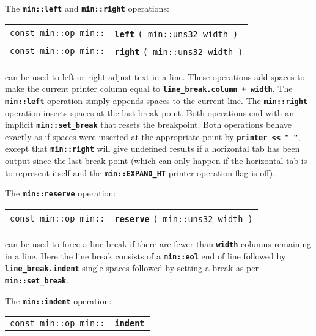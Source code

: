 \documentclass[12pt]{article}
\makeatletter
\newcommand{\TT}[1]{{\tt \bfseries #1}}
\newcommand{\ttindex}[1]{\index{#1@{\tt #1}}}
\newcommand{\EOL}{\penalty \exhyphenpenalty}
\newenvironment{indpar}[1][0.3in]%
	{\begin{list}{}%
		     {\setlength{\itemsep}{0in}%
		      \setlength{\topsep}{0in}%
		      \setlength{\parsep}{1ex}%
		      \setlength{\labelwidth}{#1}%
		      \setlength{\leftmargin}{#1}%
		      \addtolength{\leftmargin}{\labelsep}}%
	 \item}%
	{\end{list}}
\newcommand{\LABEL}[1]{\label{#1}}
\newcommand{\MINKEY}[1]%
	   {\TT{#1}\ttindex{min::#1}\ttindex{#1}}
\makeatother
\begin{document}
The \TT{min::left} and \TT{min::right} operations:

\begin{indpar}[1em]\begin{tabular}{r@{}l}
\verb|const min::op min::| & \MINKEY{left} \verb|( min::uns32 width )|
\LABEL{MIN::LEFT} \\
\verb|const min::op min::| & \MINKEY{right} \verb|( min::uns32 width )|
\LABEL{MIN::RIGHT} \\
\end{tabular}\end{indpar}

can be used to left or right adjust text in a line.
These operations add spaces to make the current printer column
equal to \TT{line\_\EOL break.column + width}.
The \TT{min::\EOL left} operation simply appends spaces to the
current line.  The \TT{min::\EOL right} operation inserts spaces
at the last break point.  Both operations end with an implicit
\TT{min::\EOL set\_\EOL break} that resets the breakpoint.
Both operations behave exactly as if spaces were inserted at the
appropriate point by \TT{printer <{}< "~"}, except that
\TT{min::right} will give undefined results if a horizontal
tab has been output since the last break point (which can only
happen if the horizontal tab is to represent itself and the
\TT{min::\EOL EXPAND\_\EOL HT} printer operation flag is off).

The \TT{min::reserve} operation:

\begin{indpar}[1em]\begin{tabular}{r@{}l}
\verb|const min::op min::| & \MINKEY{reserve} \verb|( min::uns32 width )|
\LABEL{MIN::RESERVE} \\
\end{tabular}\end{indpar}

can be used to force a line break if there are fewer than \TT{width}
columns remaining in a line.
Here the line break consists of a \TT{min::eol} end of line followed
by \TT{line\_\EOL break.indent} single spaces followed by setting a break
as per \TT{min::\EOL set\_\EOL break}.

The \TT{min::indent} operation:

\begin{indpar}[1em]\begin{tabular}{r@{}l}
\verb|const min::op min::| & \MINKEY{indent}
\LABEL{MIN::INDENT} \\
\end{tabular}\end{indpar}
\end{document}
